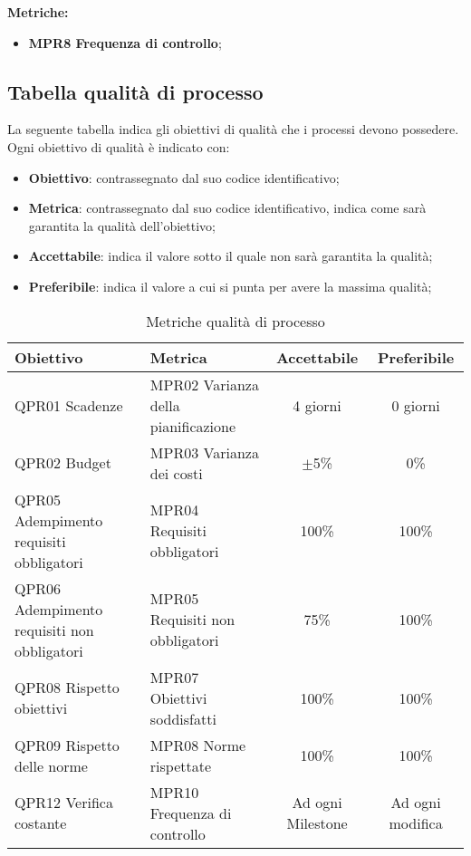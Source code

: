 \documentclass[../piano_di_qualifica.tex]{subfiles}
\begin{document}
\textbf{Metriche:}
\smallbreak
\begin{itemize}
	\item \textbf{MPR8 Frequenza di controllo};
\end{itemize}

\subsection{Tabella qualità di processo}
La seguente tabella indica gli obiettivi di qualità che i processi devono possedere.\\
Ogni obiettivo di qualità è indicato con:
\smallbreak
\begin{itemize}
	\item \textbf{Obiettivo}: contrassegnato dal suo codice identificativo;
	\item \textbf{Metrica}: contrassegnato dal suo codice identificativo, indica come sarà garantita la qualità dell'obiettivo;
	\item \textbf{Accettabile}: indica il valore sotto il quale non sarà garantita la qualità;
	\item \textbf{Preferibile}: indica il valore a cui si punta per avere la massima qualità;
\end{itemize}

\begin{table}[!ht]
	\centering
	\begin{tabular}{|p{3.5cm}|p{3.5cm}|c|c|}
		\hline
		\rowcolor{lightgray}
		\textbf{Obiettivo}                          & \textbf{Metrica}                    & \textbf{Accettabile} & \textbf{Preferibile} \\
		\hline
		QPR01 Scadenze                              & MPR02 Varianza della pianificazione & 4 giorni             & 0 giorni             \\
		\hline
		QPR02 Budget                                & MPR03 Varianza dei costi            & $\pm$5\%             & 0\%                  \\
		\hline
		QPR05 Adempimento requisiti obbligatori     & MPR04 Requisiti obbligatori         & 100\%                & 100\%                \\
		\hline
		QPR06 Adempimento requisiti non obbligatori & MPR05 Requisiti non obbligatori     & 75\%                 &  100\%                  \\
		\hline
		QPR08 Rispetto obiettivi                    & MPR07 Obiettivi soddisfatti         & 100\%                & 100\%                \\
		\hline
		QPR09 Rispetto delle norme                  & MPR08 Norme rispettate              & 100\%                & 100\%                \\
		\hline
		QPR12 Verifica costante                     & MPR10 Frequenza di controllo        & Ad ogni Milestone    & Ad ogni modifica     \\
		\hline
	\end{tabular}
	\caption{Metriche qualità di processo}
\end{table}
\end{document}
